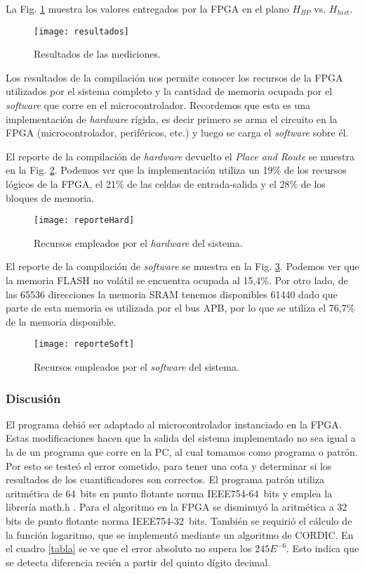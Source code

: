 La Fig. \ref{fig:resultados} muestra los valores entregados por la FPGA en el plano $H_{BP}$ vs. $H_{hist}$.
%
\begin{figure}[htb]
	\centering\texttt{[image: resultados]}
	\caption{Resultados de las mediciones.}\label{fig:resultados}
\end{figure}

Los resultados de la compilación nos permite conocer los recursos de la FPGA utilizados por el sistema completo y la cantidad de memoria ocupada por el \textit{software} que corre en el microcontrolador.
Recordemos que esta es una implementación de \textit{hardware} rígida, es decir primero se arma el circuito en la FPGA (microcontrolador, periféricos, etc.) y luego se carga el \textit{software} sobre él.

El reporte de la compilación de \textit{hardware} devuelto el \textit{Place and Route} se muestra en la Fig. \ref{fig:hard}. Podemos ver que la implementación utiliza un 19\% de los recursos lógicos de la FPGA, el 21\% de las celdas de entrada-salida y el 28\% de los bloques de memoria.
%
\begin{figure}[htb]
	\centering\texttt{[image: reporteHard]}
	\caption{Recursos empleados por el \textit{hardware} del sistema.}\label{fig:hard}
\end{figure}

El reporte de la compilación de \textit{software} se muestra en la Fig. \ref{fig:soft}.
Podemos ver que la memoria FLASH no volátil se encuentra ocupada al 15,4\%.
Por otro lado, de las 65536 direcciones la memoria SRAM tenemos disponibles 61440 dado que parte de esta memoria es utilizada por el bus APB, por lo que se utiliza el 76,7\% de la memoria disponible.
%
\begin{figure}[htb]
	\centering\texttt{[image: reporteSoft]}
	\caption{Recursos empleados por el \textit{software} del sistema.}\label{fig:soft}
\end{figure}

\subsubsection{Discusión}
\label{sec:discusion}

El programa debió ser adaptado al microcontrolador instanciado en la FPGA.
Estas modificaciones hacen que la salida del sistema implementado no sea igual a la de un programa que corre en la PC, al cual tomamos como programa o patrón.
Por esto se testeó el error cometido, para tener una cota y determinar si los resultados de los cuantificadores son correctos.
El programa patrón utiliza aritmética de 64~bits en punto flotante norma IEEE754-64~bits y emplea la librería math.h \cite{Mathe}.
Para el algoritmo en la FPGA se disminuyó la aritmética a 32 bits de punto flotante norma IEEE754-32~bits.
También se requirió el cálculo de la función logaritmo, que se implementó mediante un algoritmo de CORDIC.
En el cuadro \ref{tabla} se ve que el error absoluto no supera los $245E^{-6}$. Esto indica que se detecta diferencia recién a partir del quinto dígito decimal.

